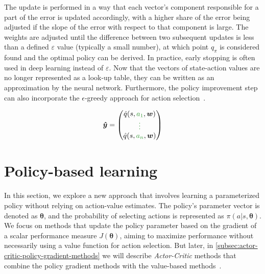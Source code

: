 \documentclass[../xlapes02]{subfiles}
\begin{document}
    The update is performed in a way that each vector's component responsible for a part of the error is updated accordingly, with a higher share of the error being adjusted if the slope of the error with respect to that component is large. The weights are adjusted until the difference between two subsequent updates is less than a defined $\varepsilon$ value (typically a small number), at which point $q_{\pi}$ is considered found and the optimal policy can be derived. In practice, early stopping is often used in deep learning instead of $\varepsilon$. Now that the vectors of state-action values are no longer represented as a look-up table, they can be written as an approximation by the neural network. Furthermore, the policy improvement step can also incorporate the $\epsilon$-greedy approach for action selection~\cite{FITMT25127, rao2022foundations, rao2022foundations}.

    \begin{equation}
        \bm{\hat{y}} = \begin{pmatrix}
                           \hat{q}(s,\textcolor[RGB]{50,150,50}{a_1},\bm{w}) \\
                           \textcolor[RGB]{50,150,50}{\vdots}                \\
                           \hat{q}(s,\textcolor[RGB]{50,150,50}{a_n},\bm{w})
        \end{pmatrix}
    \end{equation}


    \section{Policy-based learning}\label{sec:policy-based}
    In this section, we explore a new approach that involves learning a parameterized policy without relying on action-value estimates. The policy's parameter vector is denoted as $\bm{\theta}$, and the probability of selecting actions is represented as $\pi(a|s, \bm{\theta})$. We focus on methods that update the policy parameter based on the gradient of a scalar performance measure $J(\bm{\theta})$, aiming to maximize performance without necessarily using a value function for action selection. But later, in \cref{subsec:actor-critic-policy-gradient-methods} we will describe \emph{Actor-Critic} methods that combine the policy gradient methods with the value-based methods~\cite{sutton2018reinforcement}.
\end{document}
